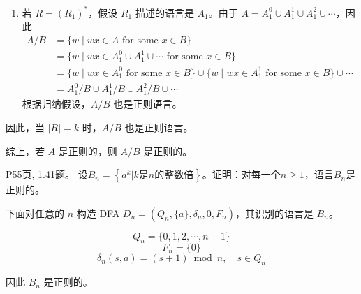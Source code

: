 \documentclass[11pt,addpoints,answers]{exam}
\begin{document}
\begin{questions}
\begin{solution}
\begin{enumerate}
另一方面，由于 \(B_2\) 中的串的所有后缀都无法被 \(R_2\) 描述，因此
\[
\begin{aligned}
&\{w \mid wx \in A_1 \circ A_2 \text{ for some } x \in B_2\} \\
&= A_1 \circ \{w \mid wx \in A_2 \text{ for some } x \in B_2\} \\
&= A_1 \circ (A_2/B_2)
\end{aligned}
\tag{11.8}
\]
由于 \(A_2\) 是由 \(R_2\) 描述的正则语言，根据归纳假设可得 \(A_2/B_2\) 也是正则语言。由于正则语言在连接运算下封闭，因此 \(A_1 \circ (A_2/B_2)\) 也是正则语言。

综合上述式可得 \(A/B\) 是两个正则语言的并集：
\[
A/B = (A_1/B'_1) \cup (A_1 \circ (A_2/B_2))
\tag{11.9}
\]
因此，\(A/B\) 也是正则语言。

\item 若 \(R = (R_1)^*\)，假设 \(R_1\) 描述的语言是 \(A_1\)。由于 \(A = A_1^0 \cup A_1^1 \cup A_1^2 \cup \cdots\)，因此
\[
\begin{aligned}
A/B &= \{w \mid wx \in A \text{ for some } x \in B\} \\
&= \{w \mid wx \in A_1^0 \cup A_1^1 \cup \cdots \text{ for some } x \in B\} \\
&= \{w \mid wx \in A_1^0 \text{ for some } x \in B\} \cup \{w \mid wx \in A_1^1 \text{ for some } x \in B\} \cup \cdots \\
&= A_1^0/B \cup A_1^1/B \cup A_1^2/B \cup \cdots
\end{aligned}
\tag{11.10}
\]
根据归纳假设，\(A/B\) 也是正则语言。
\end{enumerate}

因此，当 \(|R| = k\) 时，\(A/B\) 也是正则语言。

综上，若 \(A\) 是正则的，则 \(A/B\) 是正则的。
	\end{solution} 






    
    \question P55页, 1.41题。
    设$B_n=\left\{a^k|k\text{是}n\text{的整数倍}\right\}$。证明：对每一个$n\geq 1$，语言$B_n$是正则的。
	\begin{solution}
		下面对任意的 \( n \) 构造 DFA \( D_n = (Q_n, \{a\}, \delta_n, 0, F_n) \)，其识别的语言是 \( B_n \)。

\[
Q_n = \{0, 1, 2, \cdots, n-1\}
\]
\[
F_n = \{0\}
\]
\[
\delta_n(s, a) = (s + 1) \bmod n, \quad s \in Q_n
\]

因此 \( B_n \) 是正则的。
	\end{solution} 





\end{questions}
\end{document}
